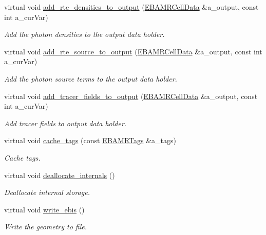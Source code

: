 \begin{DoxyCompactItemize}
virtual void \hyperlink{classplasma__engine_a1fab167c435924d4155b37b1f44546e6}{add\+\_\+rte\+\_\+densities\+\_\+to\+\_\+output} (\hyperlink{type__definitions_8H_a7e610f301989e5e07781c5e338bdb7c3}{E\+B\+A\+M\+R\+Cell\+Data} \&a\+\_\+output, const int a\+\_\+cur\+Var)
\begin{DoxyCompactList}\small\item\em Add the photon densities to the output data holder. \end{DoxyCompactList}\item 
virtual void \hyperlink{classplasma__engine_ae94010829fc59e7aa66b09114f5d23b4}{add\+\_\+rte\+\_\+source\+\_\+to\+\_\+output} (\hyperlink{type__definitions_8H_a7e610f301989e5e07781c5e338bdb7c3}{E\+B\+A\+M\+R\+Cell\+Data} \&a\+\_\+output, const int a\+\_\+cur\+Var)
\begin{DoxyCompactList}\small\item\em Add the photon source terms to the output data holder. \end{DoxyCompactList}\item 
virtual void \hyperlink{classplasma__engine_a3be0bf1e7249c716985b1ad669a1f44f}{add\+\_\+tracer\+\_\+fields\+\_\+to\+\_\+output} (\hyperlink{type__definitions_8H_a7e610f301989e5e07781c5e338bdb7c3}{E\+B\+A\+M\+R\+Cell\+Data} \&a\+\_\+output, const int a\+\_\+cur\+Var)
\begin{DoxyCompactList}\small\item\em Add tracer fields to output data holder. \end{DoxyCompactList}\item 
virtual void \hyperlink{classplasma__engine_ab1d6de35b2b234615b1069189e686f50}{cache\+\_\+tags} (const \hyperlink{type__definitions_8H_a4eb540da9eb275c3e4225830ae526113}{E\+B\+A\+M\+R\+Tags} \&a\+\_\+tags)
\begin{DoxyCompactList}\small\item\em Cache tags. \end{DoxyCompactList}\item 
virtual void \hyperlink{classplasma__engine_a7652167ce63a28ec78b9a839073df955}{deallocate\+\_\+internals} ()
\begin{DoxyCompactList}\small\item\em Deallocate internal storage. \end{DoxyCompactList}\item 
virtual void \hyperlink{classplasma__engine_ac8cd9c616150a0573e768cf7e387c719}{write\+\_\+ebis} ()
\begin{DoxyCompactList}\small\item\em Write the geometry to file. \end{DoxyCompactList}\item 

\end{DoxyCompactItemize}
